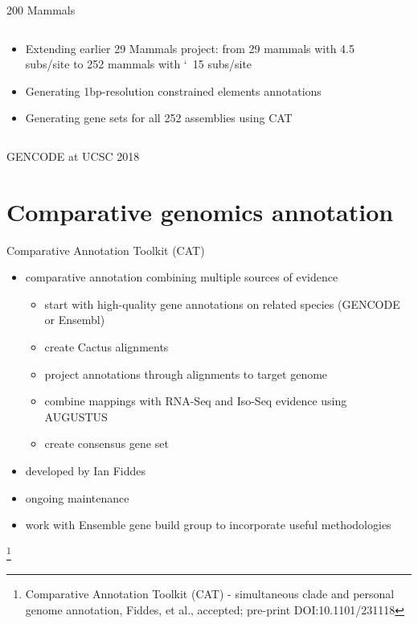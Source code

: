 \documentclass[10pt,
               hyperref={bookmarks=false,
                         bookmarksopen=false,
                         colorlinks=true,
                         linkcolor=blue,
                         urlcolor=blue},
               xcolor={svgnames,table}]{beamer}
\newcommand{\sectionframe}[1]{
  \begin{frame}{\thetitle}
    \section{#1}
  \end{frame}
}
\newcommand\blfootnote[1]{%
  \begingroup
  \renewcommand\thefootnote{}\footnote{#1}%
  \addtocounter{footnote}{-1}%
  \endgroup
}
\newenvironment{tightitemize}{%
\begin{itemize}
  \setlength{\itemsep}{1pt}%
  \setlength{\parskip}{0pt}%
  \setlength{\parsep}{0pt}%
}{\end{itemize}}
\newcommand{\thetitle}{GENCODE at UCSC 2018}
\begin{document}
\begin{frame}{200 Mammals}
  \begin{columns}
    \begin{column}{0.5\textwidth}
      \begin{itemize}
          \item Extending earlier 29 Mammals project: from 29 mammals with 4.5 subs/site to 252 mammals with \char`~15 subs/site
          \item Generating 1bp-resolution constrained elements annotations
          \item Generating gene sets for all 252 assemblies using CAT
      \end{itemize}
    \end{column}
    \begin{column}{0.5\textwidth}
    \end{column}
  \end{columns}
\end{frame}

\sectionframe{Comparative genomics annotation}

\begin{frame}{Comparative Annotation Toolkit (CAT)}
  \begin{itemize}
  \item comparative annotation combining multiple sources of evidence
    \begin{tightitemize}
    \item start with high-quality gene annotations on related species (GENCODE or Ensembl)
    \item create Cactus alignments
    \item project annotations through alignments to target genome
    \item combine mappings with RNA-Seq and Iso-Seq evidence using AUGUSTUS
    \item create consensus gene set 
    \end{tightitemize}
  \item developed by Ian Fiddes
  \item ongoing maintenance 
  \item work with Ensemble gene build group to incorporate useful methodologies
  \end{itemize}
\blfootnote{Comparative Annotation Toolkit (CAT) - simultaneous clade and personal genome annotation, Fiddes, et al., accepted; pre-print DOI:10.1101/231118}
\end{frame}
\end{document}
